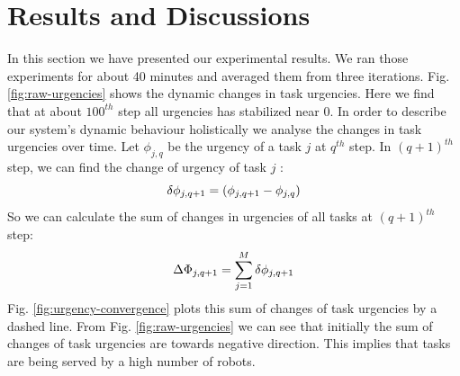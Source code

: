 \documentclass{llncs}
\begin{document}
\section{Results and Discussions}
\label{sec:results}
In this section we have presented our experimental results. We ran those experiments for about 40 minutes and averaged them from three iterations.
Fig. \ref{fig:raw-urgencies} shows the dynamic changes in task urgencies. Here we find that at about $100^{th}$ step all urgencies has stabilized near 0. %
In order to describe our system's dynamic behaviour holistically we analyse the changes in task urgencies over time. Let $ \phi_{j, q}$ be the urgency of a task $j$ at $q^{th}$ step. In $(q+1)^{th}$ step, we can find the change of urgency of task $j$ :\\
\begin{equation} 
\small
\delta \phi_{j, q+1} = ( \phi_{j, q+1} - \phi_{j, q}) 
\end{equation}
So we can calculate the sum of changes in urgencies of all tasks at $(q+1)^{th}$ step:
\begin{equation} 
\small
\Delta \Phi_{j, q+1} = \sum_{j=1}^{M} \delta \phi_{j, q+1} 
\label{eqn:Delta-Phi}
\end{equation}
Fig. \ref{fig:urgency-convergence} plots this sum of changes of task urgencies by a dashed line. %
%
%
From Fig. \ref{fig:raw-urgencies} we can see that initially the sum of changes of task urgencies are towards negative direction. This implies that tasks are being served by a high number of robots.
\end{document}
